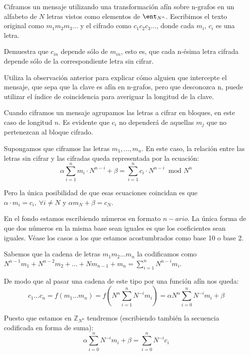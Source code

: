 \begin{problem}[2]
Ciframos un mensaje utilizando una transformación afín sobre n-grafos en un alfabeto de $N$ letras vistos como elementos de $\ent_{N^n}$. Escribimos el texto original como $m_1m_2m_3...$ y el cifrado como $c_1c_2c_3...$, donde cada $m_i$, $c_i$ es una letra.

\ppart Demuestra que $c_{in}$ depende sólo de $m_{in}$, esto es, que cada n-ésima letra cifrada depende sólo de la correspondiente letra sin cifrar.

\ppart Utiliza la observación anterior para explicar cómo alguien que intercepte el mensaje, que sepa que la clave es afín en n-grafos, pero que desconozca n, puede utilizar el índice de coincidencia para averiguar la longitud de la clave.

\solution


\spart
Cuando ciframos un mensaje agrupamos las letras a cifrar en bloques, en este caso de longitud $n$. Es evidente que $c_i$ no dependerá de aquellas $m_j$ que no pertenezcan al bloque cifrado.

Supongamos que ciframos las letras $m_1,...,m_n$. En este caso, la relación entre las letras sin cifrar y las cifradas queda representada por la ecuación:
\[α\sum_{i=1}^n m_i\cdot N^{n-i} + β= \sum_{i=1}^n c_i\cdot N^{n-i}\ \text{ mod } N^n\]

Pero la única posibilidad de que esas ecuaciones coincidan es que $α\cdot m_i=c_i, \ \forall i \neq N$ y $αm_N +β = c_N$.

\begin{remark}
En el fondo estamos escribiendo números en formato $n-ario$. La única forma de que dos números en la misma base sean iguales es que los coeficientes sean iguales. Véase los casos a los que estamos acostumbrados como base 10 o base 2.
\end{remark}


Sabemos que la cadena de letras $m_1m_2…m_n$ la codificamos como $N^{n-1}m_1 + N^{n-2}m_2 + … + Nm_{n-1} + m_n = \sum_{i=1}^n N^{n-i}m_i$.

De modo que al pasar una cadena de este tipo por una función afín nos queda:
\[c_1…c_n = f(m_1…m_n) = f\left(N^n \sum_{i=1}^n N^{-i} m_i\right) = αN^n \sum_{i=0}^nN^{-i}m_i + β\]

Puesto que estamos en $ℤ_{N^n}$ tendremos (escribiendo también la secuencia codificada en forma de suma):
\[α \sum_{i=0}^n N^{-i}m_i + β = \sum_{i=0}^n N^{-i}c_i\]


\end{problem}
